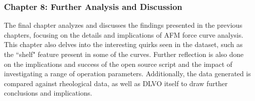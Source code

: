 \subsubsection{Chapter 8: Further Analysis and Discussion}
The final chapter analyzes and discusses the findings presented in the previous chapters, focusing on the details and implications of AFM force curve analysis. This chapter also delves into the interesting quirks seen in the dataset, such as the ``shelf" feature present in some of the curves. Further reflection is also done on the implications and success of the open source script and the impact of investigating a range of operation parameters. Additionally, the data generated is compared against rheological data, as well as DLVO itself to draw further conclusions and implications.